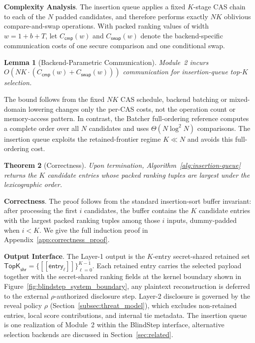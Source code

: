 \documentclass[conference,compsoc,letterpaper]{IEEEtran}
\newtheorem{theorem}{Theorem}[section]
\newtheorem{lemma}[theorem]{Lemma}
\theoremstyle{definition}
\theoremstyle{remark}
\newcommand{\myparagraph}[1]{\noindent \textbf{#1}.}
\newcommand{\BlindStep}{BlindStep\xspace}
\newcommand{\share}[1]{[\![#1]\!]}           %
\newcommand{\policy}{\rho}
\newcommand{\scorebits}{b}
\newcommand{\SharedTopK}{\mathsf{TopK}_{\mathsf{shr}}}
\begin{document}
\myparagraph{Complexity Analysis}
The insertion queue applies a fixed $K$-stage CAS chain to each of the $N$ padded candidates, and therefore performs exactly $NK$ oblivious compare-and-swap operations.
With packed ranking values of width $w=1+\scorebits+T$, let $C_{\mathsf{cmp}}(w)$ and $C_{\mathsf{swap}}(w)$ denote the backend-specific communication costs of one secure comparison and one conditional swap.

\begin{lemma}[Backend-Parametric Communication]
Module~2 incurs $O\!\left(NK\cdot
(C_{\mathsf{cmp}}(w)+C_{\mathsf{swap}}(w))\right)$ communication for insertion-queue top-$K$ selection.
\end{lemma}

\noindent
The bound follows from the fixed $NK$ CAS schedule, backend batching or mixed-domain lowering changes only the per-CAS costs, not the operation count or memory-access pattern.
In contrast, the Batcher full-ordering reference computes a complete order over all $N$ candidates and uses $\Theta(N\log^2N)$ comparisons.
The insertion queue exploits the retained-frontier regime $K\ll N$ and avoids this full-ordering cost.

\begin{theorem}[Correctness]
Upon termination, Algorithm~\ref{alg:insertion-queue} returns the $K$ candidate entries whose packed ranking tuples are largest under the lexicographic order.
\end{theorem}
\smallskip

\myparagraph{Correctness}
The proof follows from the standard insertion-sort buffer invariant: after processing the first $i$ candidates, the buffer contains the $K$ candidate entries with the largest packed ranking tuples among those $i$ inputs, dummy-padded when $i<K$.
We give the full induction proof in Appendix~\ref{app:correctness_proof}.
\smallskip

\myparagraph{Output Interface}
\label{subsec:output}
The Layer-1 output is the $K$-entry secret-shared retained set $\SharedTopK=\{\share{\mathsf{entry}_\ell}\}_{\ell=0}^{K-1}$.
Each retained entry carries the selected payload together with the secret-shared ranking fields at the kernel boundary shown in Figure~\ref{fig:blindstep_system_boundary}, any plaintext reconstruction is deferred to the external $\policy$-authorized disclosure step.
Layer-2 disclosure is governed by the reveal policy $\policy$ (Section~\ref{subsec:threat_model}), which excludes non-retained entries, local score contributions, and internal tie metadata.
The insertion queue is one realization of Module~2 within the \BlindStep{} interface, alternative selection backends are discussed in Section~\ref{sec:related}.
\end{document}
